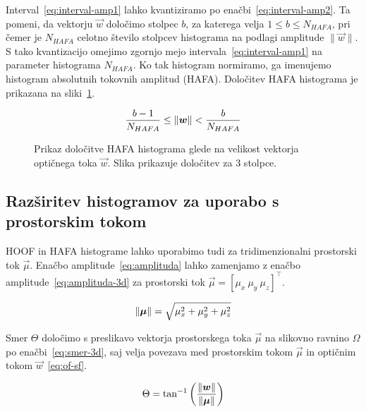 Interval~\eqref{eq:interval-amp1} lahko kvantiziramo po enačbi~\eqref{eq:interval-amp2}. Ta pomeni, da vektorju $\vec{w}$ določimo stolpec $b$, za katerega velja $1 \leq b \leq N_{HAFA}$, pri čemer je $N_{HAFA}$ celotno število stolpcev histograma na podlagi amplitude $\| \vec{w} \|$. S tako kvantizacijo omejimo zgornjo mejo intervala~\eqref{eq:interval-amp1} na parameter histograma $N_{HAFA}$. Ko tak histogram normiramo, ga imenujemo histogram absolutnih tokovnih amplitud (HAFA). Določitev HAFA histograma je prikazana na sliki~\ref{fig:hafa-histogram}.

\begin{equation}\label{eq:interval-amp2}
	\frac{b-1}{N_{HAFA}} \leq \left\lVert {\boldsymbol{w}} \right\rVert < \frac{b}{N_{HAFA}}
\end{equation}




\begin{figure}[!htb]
\centering
\resizebox{0.5\columnwidth}{!}{}
\caption[Prikaz določitve HAFA histograma glede na velikost vektorja]{Prikaz določitve HAFA histograma glede na velikost vektorja optičnega toka $\vec{w}$. Slika prikazuje določitev za $3$ stolpce.}
\label{fig:hafa-histogram}
\end{figure}



\subsection{Razširitev histogramov za uporabo s prostorskim tokom}
HOOF in HAFA histograme lahko uporabimo tudi za tridimenzionalni prostorski tok $\vec{\mu}$. Enačbo amplitude~\eqref{eq:amplituda} lahko zamenjamo z enačbo amplitude~\eqref{eq:amplituda-3d} za prostorski tok $\vec{\mu} = \left[\mu_x~\mu_y~\mu_z \right]^\top$.

\begin{equation}
\left\lVert {\boldsymbol{\mu}} \right\rVert = \sqrt{\mu_x^2 + \mu_y^2 + \mu_z^2} 
\label{eq:amplituda-3d}
\end{equation}

Smer $\Theta$ določimo s preslikavo vektorja prostorskega toka $\vec{\mu}$ na slikovno ravnino $\varOmega$ po enačbi~\eqref{eq:smer-3d}, saj velja povezava med prostorskim tokom $\vec{\mu}$ in optičnim tokom $\vec{w}$~\eqref{eq:of-sf}.


\begin{equation}
\Theta = \tan^{-1}\left( \frac{\left\lVert {\boldsymbol{w}} \right\rVert}{\left\lVert {\boldsymbol{\mu}} \right\rVert} \right)
\label{eq:smer-3d}
\end{equation}

